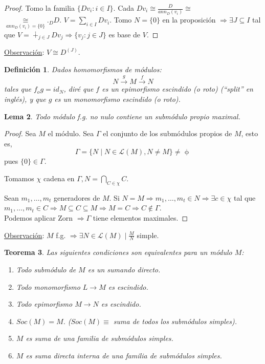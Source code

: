 \documentclass[11pt,a4paper]{article}
\theoremstyle{break}
\newtheorem{theorem}{Teorema}[section]
\newtheorem{lemma}[theorem]{Lema}
\newtheorem{definition}[theorem]{Definición}
\begin{document}
\begin{proof}
Tomo la familia $\{Dv_{i}: i \in I\}$. Cada $Dv_{i} \cong \frac{D}{ann_{D}(v_{i})} \cong$ \\ $ \underset{ann_{D}(v_{i}) = \{0\}}{\cong} ._{D}D$. $V = \sum_{i \in I} Dv_{i}$. Tomo $N = \{0\}$ en la proposición $\Rightarrow \exists J \subseteq I$ tal que $V = \dotplus_{j \in J} D v_{j} \Rightarrow \{v_{j}: j \in J\}$ es base de $V$.
\end{proof}

\underline{Observación}: $V \cong D^{(J)}$.

\begin{definition}
Dados homomorfismos de módulos:
$$N \overset{g}{\to} M \overset{f}{\to} N$$
tales que $f_{o}g = id_{N}$, diré que $f$ es un epimorfismo escindido (o roto) (``split'' en inglés), y que $g$ es un monomorfismo escindido (o roto).
\end{definition}

\begin{lemma}
Todo módulo f.g. no nulo contiene un submódulo propio maximal.
\end{lemma}

\begin{proof}
Sea $M$ el módulo. Sea $\Gamma$ el conjunto de los submódulos propios de $M$, esto es, 
$$\Gamma = \{N \mid N \in \mathcal{L}(M), N \neq M\} \neq \upphi$$
pues $\{0\} \in \Gamma$.

Tomamos $\chi$ cadena en $\Gamma, N = \bigcap\limits_{C \in \chi} C$.

Sean $m_{1}, \dots, m_{t}$ generadores de $M$. Si $N = M \Rightarrow m_{1}, \dots, m_{t} \in N \Rightarrow \exists c \in \chi$ tal que $m_{1}, \dots, m_{t} \in C \Rightarrow M \subseteq C \subseteq M \Rightarrow M = C \Rightarrow C \notin \Gamma$. \\
Podemos aplicar Zorn $\Rightarrow \Gamma$ tiene elementos maximales.
\end{proof}

\underline{Observación}: $M$ f.g. $\Rightarrow \exists N \in \mathcal{L}(M) \mid \frac{M}{N}$ simple.

\begin{theorem}
Las siguientes condiciones son equivalentes para un módulo $M$:
\begin{enumerate}
\item Todo submódulo de $M$ es un sumando directo.
\item Todo monomorfismo $L \to M$ es escindido.
\item Todo epimorfismo $M \to N$ es escindido.
\item $Soc(M) = M$. ($Soc(M) \equiv$ suma de todos los submódulos simples).
\item $M$ es suma de una familia de submódulos simples.
\item $M$ es suma directa interna de una familia de submódulos simples.
\end{enumerate}
\end{theorem}
\end{document}
